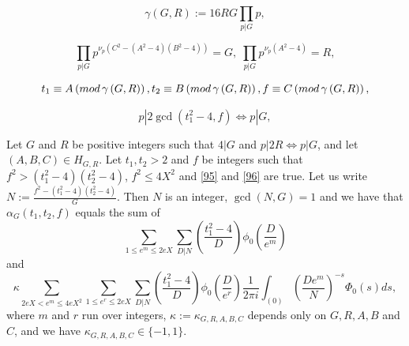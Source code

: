 \documentclass[10pt,a4paper]{amsart}
\begin{document}
\begin{equation}\gamma\left(G,R\right):=16RG\prod_{p|G}p,\label{679}\end{equation}

\begin{equation}\prod_{p|G}p^{\nu_p\left(C^2-\left(A^2-4\right)\left
(B^2-4\right)\right)}=G,\;\prod_{p|G}p^{\nu_p\left(A^2-4\right)}=
R,\label{680}\end{equation}

\begin{equation}t_1\equiv A\left({\rm m}{\rm o}{\rm d}\,\gamma\left
(G,R\right)\right),t_2\equiv B\left({\rm m}{\rm o}{\rm d}\,\gamma\left
(G,R\right)\right),f\equiv C\left({\rm m}{\rm o}{\rm d}\,\gamma\left
(G,R\right)\right),\label{95}\end{equation}

\begin{equation}p|2\gcd\left(t_1^2-4,f\right)\Leftrightarrow p|G,\label{96}\end{equation}

\begin{lemma}\label{lem:12,9} Let $G$ and $R$ be positive integers such that $
4|G$ and
$p|2R\Leftrightarrow p|G$, and let $\left(A,B,C\right)\in H_{G,R}$. Let $
t_1,t_2>2$ and $f$ be integers such that
$f^2>\left(t_1^2-4\right)\left(t_2^2-4\right)$, $f^2\le 4X^2$ and \eqref{95} and \eqref{96}
are true. Let us write $N:=\frac {f^2-\left(t_1^2-4\right)\left(t_
2^2-4\right)}G$. Then $N$ is
an integer, $\gcd\left(N,G\right)=1$ and we have that $\alpha_G\left
(t_1,t_2,f\right)$ equals the sum of
\[\sum_{1\le e^m\le 2eX}\sum_{D|N}\left(\frac {t_1^2-4}D\right)\phi_
0\left(\frac D{e^m}\right)\]
and
\[\kappa\sum_{2eX<e^m\le 4eX^2}\sum_{1\le e^r\le 2eX}\sum_{D|N}\left
(\frac {t_1^2-4}D\right)\phi_0\left(\frac D{e^r}\right)\frac 1{2\pi
i}\int_{\left(0\right)}\left(\frac {De^m}N\right)^{-s}\Phi_0\left
(s\right)ds,\]
where $m$ and $r$ run over integers, $\kappa :=\kappa_{G,R,A,B,C}$ depends only on $
G,R,A,B$ and $C$, and we have $\kappa_{G,R,A,B,C}\in \{-1,1\}$.
\end{lemma}
\end{document}
